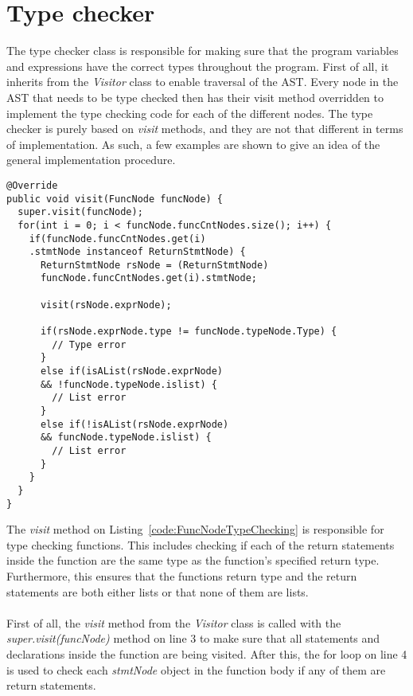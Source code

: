 \chapter{Type checker}\label{ch:TypeCheckerImplimentation}
The type checker class is responsible for making sure that the program variables and expressions have the correct types throughout the program. First of all, it inherits from the \textit{Visitor} class to enable traversal of the AST. Every node in the AST that needs to be type checked then has their visit method overridden to implement the type checking code for each of the different nodes. The type checker is purely based on \textit{visit} methods, and they are not that different in terms of implementation. As such, a few examples are shown to give an idea of the general implementation procedure.

\begin{lstlisting}[caption={Type checking for functions}, label={code:FuncNodeTypeChecking}]
@Override
public void visit(FuncNode funcNode) {
  super.visit(funcNode);
  for(int i = 0; i < funcNode.funcCntNodes.size(); i++) {
    if(funcNode.funcCntNodes.get(i)
    .stmtNode instanceof ReturnStmtNode) {
      ReturnStmtNode rsNode = (ReturnStmtNode) 
      funcNode.funcCntNodes.get(i).stmtNode;
			
      visit(rsNode.exprNode);
			
      if(rsNode.exprNode.type != funcNode.typeNode.Type) {
        // Type error
      }
      else if(isAList(rsNode.exprNode)
      && !funcNode.typeNode.islist) {
        // List error
      }
      else if(!isAList(rsNode.exprNode) 
      && funcNode.typeNode.islist) {
        // List error
      }
    }
  }
}
\end{lstlisting}
The \textit{visit} method on Listing~\ref{code:FuncNodeTypeChecking} is responsible for type checking functions.
This includes checking if each of the return statements inside the function are the same type as the function's specified return type. 
Furthermore, this ensures that the functions return type and the return statements are both either lists or that none of them are lists. 
\\\\
First of all, the \textit{visit} method from the \textit{Visitor} class is called with the \textit{super.visit(funcNode)} method on line 3 to make sure that all statements and declarations inside the function are being visited. 
After this, the for loop on line 4 is used to check each \textit{stmtNode} object in the function body if any of them are return statements. 

